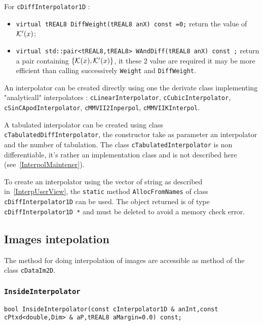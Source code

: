 For {\tt cDiffInterpolator1D} :

\begin{itemize}
    \item   {\tt virtual tREAL8  DiffWeight(tREAL8  anX) const =0;}  return the value of $\mathcal K'(x)$;

    \item {\tt virtual std::pair<tREAL8,tREAL8>  WAndDiff(tREAL8  anX) const ;}  return a pair containing
          $\{\mathcal K(x),\mathcal K'(x)\}$, it these $2$ value are required it may be more efficient than calling
          successively {\tt Weight} and {\tt DiffWeight}.
\end{itemize}

An interpolator can be created directly using one the derivate class implementing "analyticall"
interpolators :  {\tt cLinearInterpolator}, {\tt cCubicInterpolator}, {\tt cSinCApodInterpolator},
{\tt cMMVII2Inperpol}, {\tt cMMVIIKInterpol}.


A tabulated interpolator can be created using class {\tt cTabulatedDiffInterpolator},
the constructor take as parameter an interpolator and the number of tabulation.
The class {\tt cTabulatedInterpolator} is non differentiable, it's rather an implementation
class and is not described here (see~\ref{InterpolMaintener}).


To create an interpolator using the vector of string as described in~\ref{InterpUserView},
the {\tt static}  method {\tt AllocFromNames} of class {\tt cDiffInterpolator1D} can be used.
The object returned is of type {\tt cDiffInterpolator1D *} and must be deleted to avoid
a memory check error.


\subsection{Images intepolation}
\label{InterpolProgImAccess}

The method for doing interpolation of images are accessible as method of  the class {\tt cDataIm2D}.



\subsubsection{{\tt InsideInterpolator}}

{\tt bool InsideInterpolator(const cInterpolator1D \& anInt,const cPtxd<double,Dim> \& aP,tREAL8 aMargin=0.0) const; }

